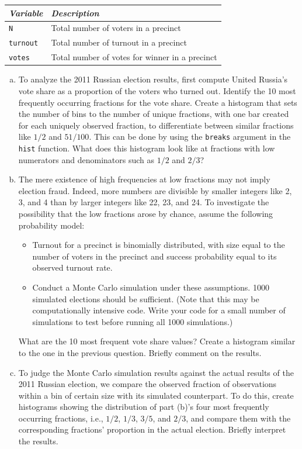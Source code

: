 \documentclass[11pt]{article}
\begin{document}
\vspace{1mm}
\begin{center}
\begin{tabular}{l p{11cm}}
 \hline
\textit{Variable} & \textit{Description} \\
\hline
 {\tt N} &                 Total number of voters in a precinct \\
{\tt turnout} &          Total number of turnout in a precinct \\
{\tt votes} &             Total number of votes for winner in a precinct \\
\hline
\end{tabular}
\end{center}
\begin{enumerate}[a.]
\item To analyze the 2011 Russian election results, first compute United Russia's vote share as a proportion of the voters who turned out.  Identify the 10 most frequently occurring fractions for the vote share.  Create a histogram that sets the number of bins to the number of unique fractions, with one bar created for each uniquely observed fraction, to differentiate between similar fractions like $1/2$ and $51/100$. This can be done by using the {\tt breaks} argument in the {\tt hist} function.  What does this histogram look like at fractions with low numerators and denominators such as $1/2$ and $2/3$?
\item The mere existence of high frequencies at low fractions may not imply election fraud.  Indeed, more numbers are divisible by smaller integers like 2, 3, and 4 than by larger integers like 22, 23, and 24.  To investigate the possibility that the low fractions arose by chance, assume the following probability model:
\begin{itemize}
	\item Turnout for a precinct is binomially distributed, with size equal to the number of voters in the precinct and success probability equal to its observed turnout rate.
	\item Conduct a Monte Carlo simulation under these assumptions. 1000 simulated elections should be sufficient.  (Note that this may be computationally intensive code.  Write your code for a small number of simulations to test before running all 1000 simulations.)
\end{itemize}
What are the 10 most frequent vote share values?  Create a histogram similar to the one in the previous question.  Briefly comment on the results.
\item To judge the Monte Carlo simulation results against the actual results of the 2011 Russian election, we compare the observed fraction of observations within a bin of certain size with its simulated counterpart.  To do this, create histograms showing the distribution of part (b)'s four most frequently occurring fractions, i.e., $1/2$, $1/3$, $3/5$, and $2/3$, and compare them with the corresponding fractions' proportion in the actual election. Briefly interpret the results.

\end{enumerate}
\end{document}
